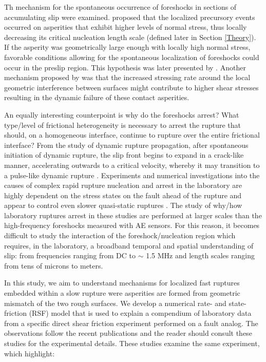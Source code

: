 \documentclass[preprint,1p, 10pt,authoryear]{elsarticle}
\begin{document}
Th mechanism for the spontaneous occurrence of foreshocks in sections of accumulating slip were examined.  \citet{Selvadurai2017} proposed that the localized precursory events occurred on asperities that exhibit higher levels of normal stress, thus locally decreasing its critical nucleation length scale (defined later in Section \ref{Theory}). If the asperity was geometrically large enough with locally high normal stress, favorable conditions allowing for the spontaneous localization of foreshocks could occur in the preslip region. This hypothesis was later presented by \citet{McLaskey2019}. Another mechanism proposed by \citet{McLaskey2013} was that the increased stressing rate around the local geometric interference between surfaces might contribute to higher shear stresses resulting in the dynamic failure of these contact asperities.  

An equally interesting counterpoint is why do the foreshocks arrest? What type/level of frictional heterogeneity is necessary to arrest the rupture that should, on a homogeneous interface, continue to rupture over the entire frictional interface? From the study of dynamic rupture propagation, after spontaneous initiation of dynamic rupture, the slip front begins to expand in a crack-like manner, accelerating outwards to a critical velocity, whereby it may transition to a pulse-like dynamic rupture \citep{Heaton1990, Meier2016}. Experiments and numerical investigations into the causes of complex rapid rupture nucleation and arrest in the laboratory are highly dependent on the stress states on the fault ahead of the rupture \citep{Rubinstein2004, Rubinstein2006, Ben-David2010,Svetlizky2014,Fineberg2015, Maegawa2010, Tromborg2011, Kammer2012, Kammer2015} and appear to control even slower quasi-static ruptures \citep{Selvadurai2017a}. The study of why/how laboratory ruptures arrest in these studies are performed at larger scales than the high-frequency foreshocks measured with AE sensors. For this reason, it becomes difficult to study the interaction of the foreshock/nucleation region which requires, in the laboratory, a broadband temporal and spatial understanding of slip: from frequencies ranging from DC to $\sim$ 1.5 MHz and length scales ranging from tens of microns to meters. 

In this study, we aim to understand mechanisms for localized fast ruptures embedded within a slow rupture were asperities are formed from geometric mismatch of the two rough surfaces. We develop a numerical rate- and state-friction (RSF) model \citep{Dieterich1979,Ampuero2008, Rubin2005} that is used to explain a compendium of laboratory data from a specific direct shear friction experiment performed on a fault analog. The observations follow the recent publications and the reader should consult these studies for the experimental details. These studies examine the same experiment, which highlight:
\end{document}
